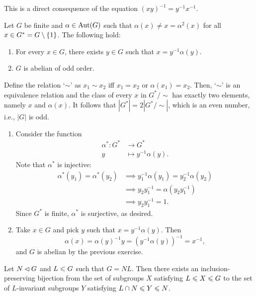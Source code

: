 \begin{solution} This is a direct consequence of the equation $(xy)^{-1}=y^{-1}x^{-1}$.  \end{solution}

\begin{exr}
    Let\/ $G$ be finite and\/ $\alpha \in {\rm Aut}(G)$ such that\/ $\alpha(x) \neq x = \alpha^2(x)$ for all\/ $x \in G^* = G\setminus\{1\}$. The following hold:
    \begin{enumerate}[\upshape a)]
        \item For every\/ $x \in G$, there exists\/ $y \in G$ such that\/ $x = y^{-1}\alpha(y)$.
        \item $G$ is abelian of odd order.
    \end{enumerate}
\end{exr}

\begin{solution}
Define the relation `$\sim$' as $x_1\sim x_2$ iff $x_1=x_2$ or $\alpha(x_1)=x_2$. Then, `$\sim$' is an equivalence relation and the class of every $x$ in $G^*\!/{\sim}$ has exactly two elements, namely $x$ and $\alpha(x)$. It follows that $|G^*|=2|G^*\!/{\sim}|$, which is an even number, i.e., $|G|$ is odd.

\begin{enumerate}[\upshape a)]
    \item Consider the function
    \begin{align*}
        \alpha^*\colon G^*&\to G^*\\
        y&\mapsto y^{-1}\alpha(y).
    \end{align*}
    Note that $\alpha^*$ is injective:
    \begin{align*}
        \alpha^*(y_1)=\alpha^*(y_2)
            &\implies y_1^{-1}\alpha(y_1)=y_2^{-1}\alpha(y_2)\\
            &\implies y_2y_1^{-1}=\alpha(y_2y_1^{-1})\\
            &\implies y_2y_1^{-1}=1.
    \end{align*}
    Since $G^*$ is finite, $\alpha^*$ is surjective, as desired.

    \item Take $x\in G$ and pick $y$ such that $x=y^{-1}\alpha(y)$. Then
    $$
        \alpha(x) = \alpha(y)^{-1}y=(y^{-1}\alpha(y))^{-1}=x^{-1},
    $$
    and $G$ is abelian by the previous exercise.
\end{enumerate}
\end{solution}

\begin{exr}
    Let\/ $N\lhd G$ and\/ $L\leqslant G$ such that\/ $G = NL$. Then there exists an inclusion-preserving bijection from the set of subgroups\/ $X$ satisfying\/ $L\leqslant X\leqslant G$ to the set of\/ $L$-invariant subgroups\/ $Y$ satisfying\/ $L\cap N\leqslant Y\leqslant N$.
\end{exr}

